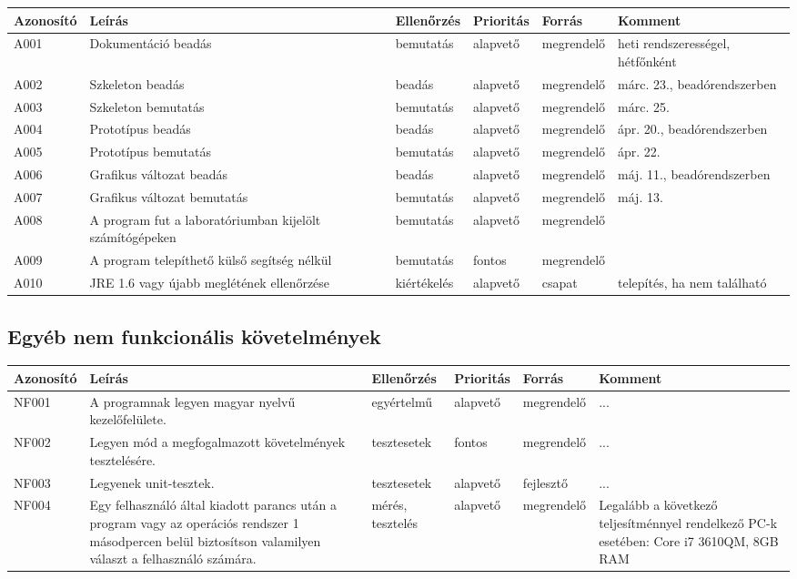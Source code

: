 \begin{tabularx}{\linewidth}{| l | X | l | l | l | X |}
\hline
\textbf{Azonosító}   & \textbf{Leírás} & \textbf{Ellenőrzés} & \textbf{Prioritás} & \textbf{Forrás} & \textbf{Komment} \tabularnewline
\hline\hline
\endhead
A001 & Dokumentáció beadás & bemutatás & alapvető & megrendelő & heti rendszerességel, hétfőnként \tabularnewline \hline
A002 & Szkeleton beadás & beadás & alapvető & megrendelő & márc. 23., beadórendszerben \tabularnewline \hline
A003 & Szkeleton bemutatás & bemutatás & alapvető & megrendelő & márc. 25. \tabularnewline \hline
A004 & Prototípus beadás & beadás & alapvető & megrendelő & ápr. 20., beadórendszerben \tabularnewline \hline
A005 & Prototípus bemutatás & bemutatás & alapvető & megrendelő & ápr. 22.  \tabularnewline \hline
A006 & Grafikus változat beadás & beadás & alapvető & megrendelő & máj. 11., beadórendszerben  \tabularnewline \hline
A007 & Grafikus változat bemutatás & bemutatás & alapvető & megrendelő & máj. 13. \tabularnewline \hline
A008 & A program fut a laboratóriumban kijelölt számítógépeken & bemutatás & alapvető & megrendelő & \tabularnewline \hline
A009 & A program telepíthető külső segítség nélkül & bemutatás & fontos & megrendelő & \tabularnewline \hline
A010 & JRE 1.6 vagy újabb meglétének ellenőrzése & kiértékelés & alapvető & csapat & telepítés, ha nem található \tabularnewline \hline
\end{tabularx}

\subsection{Egyéb nem funkcionális követelmények}

\begin{tabularx}{\linewidth}{| l | X | l | l | l | X |}
\hline
\textbf{Azonosító}   & \textbf{Leírás} & \textbf{Ellenőrzés} & \textbf{Prioritás} & \textbf{Forrás} & \textbf{Komment} \tabularnewline
\hline\hline
\endhead
NF001 & 
A programnak legyen magyar nyelvű kezelőfelülete.
& egyértelmű & alapvető & megrendelő & ... \tabularnewline \hline
NF002 & 
Legyen mód a megfogalmazott követelmények tesztelésére.
& tesztesetek & fontos & megrendelő & ... \tabularnewline \hline
NF003 & 
Legyenek unit-tesztek.
& tesztesetek & alapvető & fejlesztő & ... \tabularnewline \hline
NF004 & 
Egy felhasználó által kiadott parancs után a program vagy az operációs rendszer 1 másodpercen belül biztosítson valamilyen választ a felhasználó számára.  
& mérés, tesztelés & alapvető & megrendelő & Legalább a következő teljesítménnyel rendelkező PC-k esetében: Core i7 3610QM, 8GB RAM \tabularnewline \hline

	
\end{tabularx}


